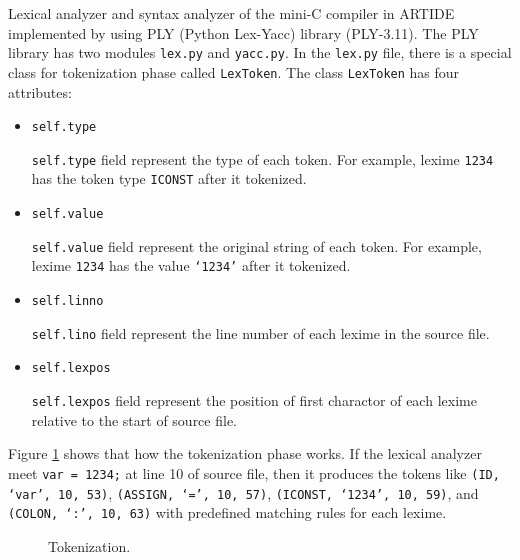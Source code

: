 \documentclass{article}
\newcommand{\code}[1]{\texttt{#1}}
\begin{document}
	Lexical analyzer and syntax analyzer of the mini-C compiler in ARTIDE implemented by using PLY (Python Lex-Yacc) library (PLY-3.11). The PLY library has two modules \code{lex.py} and \code{yacc.py}. In the \code{lex.py} file, there is a special class for tokenization phase called \code{LexToken}. The class \code{LexToken} has four attributes:
	
	\begin{itemize}
		\item \code{self.type}
		
		\code{self.type} field represent the type of each token. For example, lexime \code{1234} has the token type \code{ICONST} after it tokenized.
		
		\item \code{self.value}
		
		\code{self.value} field represent the original string of each token. For example, lexime \code{1234} has the value \code{`1234'} after it tokenized.
		
		\item \code{self.linno}
		
		\code{self.lino} field represent the line number of each lexime in the source file.
		
		\item \code{self.lexpos}
		
		\code{self.lexpos} field represent the position of first charactor of each lexime relative to the start of source file.
	\end{itemize}
	
	Figure \ref{fig: tokenization} shows that how the tokenization phase works. If the lexical analyzer meet \code{var = 1234;} at line 10 of source file, then it produces the tokens like \code{\code{(ID, `var', 10, 53)}}, \code{(ASSIGN, `=', 10, 57)}, \code{(ICONST, `1234', 10, 59)}, and \code{(COLON, `:', 10, 63)} with predefined matching rules for each lexime.
	
	\begin{figure}[ht]
		\centering
		\caption{Tokenization.}
		\label{fig: tokenization}
	\end{figure}
	
\end{document}
